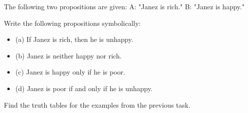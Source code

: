\documentclass[11pt,paper=b5,footinclude,headinclude]{scrbook} %
\theoremstyle{remark}
\theoremstyle{definition} %
\theoremstyle{theorem} %
\newtheorem{ex}{Exercise\hypertarget{sol:\theex}}[chapter]
\begin{document}
\begin{ex}     
The following two propositions are given:
A: "Janez is rich."
B: "Janez is happy."

Write the following propositions symbolically:
\begin{itemize}
    \item (a) If Janez is rich, then he is unhappy.
    \item (b) Janez is neither happy nor rich.
    \item (c) Janez is happy only if he is poor.
    \item (d) Janez is poor if and only if he is unhappy.
\end{itemize}

\end{ex} \begin{ex} 
Find the truth tables for the examples from the previous task.


\end{ex} 
\end{document}
